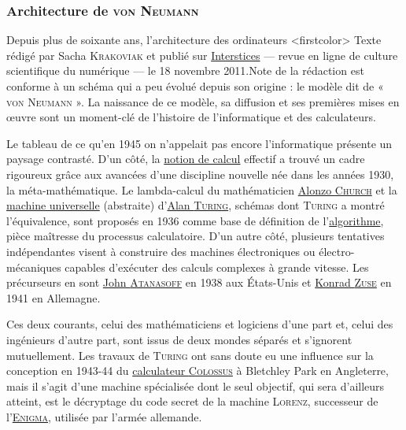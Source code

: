 

\subsubsection[Architecture de \textsc{von Neumann}]{Architecture de \textsc{von Neumann}}
\label{subsub:I.1.2.2}

Depuis plus de soixante ans, l’architecture des ordinateurs
\caution[t]<firstcolor>{%
Texte rédigé par Sacha \textsc{Krakoviak} et publié sur \href{https://interstices.info/le-modele-darchitecture-de-von-neumann/}{Interstices} --- revue en ligne de culture scientifique du numérique --- le 18 novembre 2011.}{Note de la rédaction}
est con\-forme à un schéma qui a peu évolué depuis son origine : le modèle dit de « \textsc{von Neumann} ». La naissance de ce modèle, sa diffusion et ses premières mises en œuvre sont un moment-clé de l’histoire de l’informatique et des calculateurs.

Le tableau de ce qu’en 1945 on n’appelait pas encore l’informatique présente un paysage contrasté. D’un côté, la \href{https://interstices.info/le-calcul-une-notion-difficile-a-attraper/}{notion de calcul} effectif a trouvé un cadre rigoureux grâce aux avancées d’une discipline nouvelle née dans les années 1930, la méta-mathématique. Le lambda-calcul du mathématicien \href{http://serge.mehl.free.fr/chrono/church.html}{Alonzo \textsc{Church}} et la \href{https://interstices.info/comment-fonctionne-une-machine-de-turing/}{machine universelle} (abstraite) d’\href{https://interstices.info/turing-a-lassaut-denigma/}{Alan \textsc{Turing}}, schémas dont \textsc{Turing} a montré l’équivalence, sont proposés en 1936 comme base de définition de l’\href{https://interstices.info/quest-ce-quun-algorithme/}{algorithme}, pièce maîtresse du processus calculatoire. D’un autre côté, plusieurs tentatives indépendantes visent à construire des machines électroniques ou électro-mécaniques capables d’exécuter des calculs complexes à grande vitesse. Les précurseurs en sont \href{https://fr.wikipedia.org/wiki/Djon_Atanasov}{John \textsc{Atanasoff}} en 1938 aux États-Unis et \href{https://fr.wikipedia.org/wiki/Konrad_Zuse}{Konrad \textsc{Zuse}} en 1941 en Allemagne.

Ces deux courants, celui des mathématiciens et logiciens d'une part et, celui des ingénieurs d'autre part, sont issus de deux mondes séparés et s’ignorent mutuellement. Les travaux de \textsc{Turing} ont sans doute eu une influence sur la conception en 1943-44 du \href{http://www.histoire-informatique.org/musee/2_3_2.html}{calculateur \textsc{Colossus}} à Bletchley Park en Angleterre, mais il s’agit d’une machine spécialisée dont le seul objectif, qui sera d’ailleurs atteint, est le décryptage du code secret de la machine \textsc{Lorenz}, successeur de l’\href{https://interstices.info/enigma/}{\textsc{Enigma}}, utilisée par l’armée allemande.

